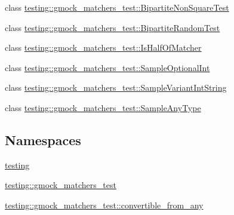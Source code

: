 \begin{DoxyCompactItemize}
\item 
class \mbox{\hyperlink{classtesting_1_1gmock__matchers__test_1_1_bipartite_non_square_test}{testing\+::gmock\+\_\+matchers\+\_\+test\+::\+Bipartite\+Non\+Square\+Test}}
\item 
class \mbox{\hyperlink{classtesting_1_1gmock__matchers__test_1_1_bipartite_random_test}{testing\+::gmock\+\_\+matchers\+\_\+test\+::\+Bipartite\+Random\+Test}}
\item 
class \mbox{\hyperlink{classtesting_1_1gmock__matchers__test_1_1_is_half_of_matcher}{testing\+::gmock\+\_\+matchers\+\_\+test\+::\+Is\+Half\+Of\+Matcher}}
\item 
class \mbox{\hyperlink{classtesting_1_1gmock__matchers__test_1_1_sample_optional_int}{testing\+::gmock\+\_\+matchers\+\_\+test\+::\+Sample\+Optional\+Int}}
\item 
class \mbox{\hyperlink{classtesting_1_1gmock__matchers__test_1_1_sample_variant_int_string}{testing\+::gmock\+\_\+matchers\+\_\+test\+::\+Sample\+Variant\+Int\+String}}
\item 
class \mbox{\hyperlink{classtesting_1_1gmock__matchers__test_1_1_sample_any_type}{testing\+::gmock\+\_\+matchers\+\_\+test\+::\+Sample\+Any\+Type}}
\end{DoxyCompactItemize}
\subsection*{Namespaces}
\begin{DoxyCompactItemize}
\item 
 \mbox{\hyperlink{namespacetesting}{testing}}
\item 
 \mbox{\hyperlink{namespacetesting_1_1gmock__matchers__test}{testing\+::gmock\+\_\+matchers\+\_\+test}}
\item 
 \mbox{\hyperlink{namespacetesting_1_1gmock__matchers__test_1_1convertible__from__any}{testing\+::gmock\+\_\+matchers\+\_\+test\+::convertible\+\_\+from\+\_\+any}}
\end{DoxyCompactItemize}
